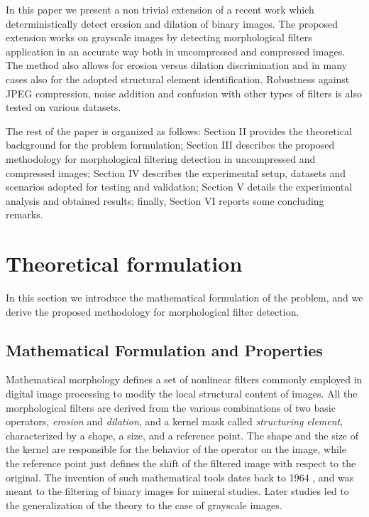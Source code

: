 \documentclass[review]{elsarticle}
\begin{document}
In this paper we present a non trivial extension of a recent work \cite{de2017detecting} which deterministically detect erosion and dilation of binary images. The proposed extension works on grayscale images by detecting morphological filters application in an accurate way both in uncompressed and compressed images. The method also allows for erosion versus dilation discrimination and in many cases also for the adopted structural element identification. %
Robustness against JPEG compression, noise addition and confusion with other types of filters is also tested on various datasets. 

The rest of the paper is organized as follows: Section II provides the theoretical background for the problem formulation; Section III describes the proposed methodology for morphological filtering detection in uncompressed and compressed images; Section IV describes the experimental setup, datasets and scenarios adopted for testing and validation; Section V details the experimental analysis and  obtained results; finally, Section VI reports some concluding remarks.   

\section{Theoretical formulation}
\label{sec:method}
In this section we introduce the mathematical formulation of the problem, and we derive the proposed methodology for morphological filter detection. 

\subsection{Mathematical Formulation and Properties}
Mathematical morphology defines a set of nonlinear filters commonly employed in digital image processing to modify the local structural content of images. All the morphological filters are derived from the various combinations of two basic operators, \textit{erosion} and \textit{dilation}, and a kernel mask called \textit{structuring element}, characterized by a shape, a size, and a reference point. The shape and the size of the kernel are responsible for the behavior of the operator on the image, while the reference point just defines the shift of the filtered image with respect to the original. The invention of such mathematical tools dates back to 1964 \cite{haas1967morphologie}, and was meant to the filtering of binary images for mineral studies. Later studies \cite{nakagawa1977note} led to the generalization of the theory to the case of grayscale images.
\end{document}
